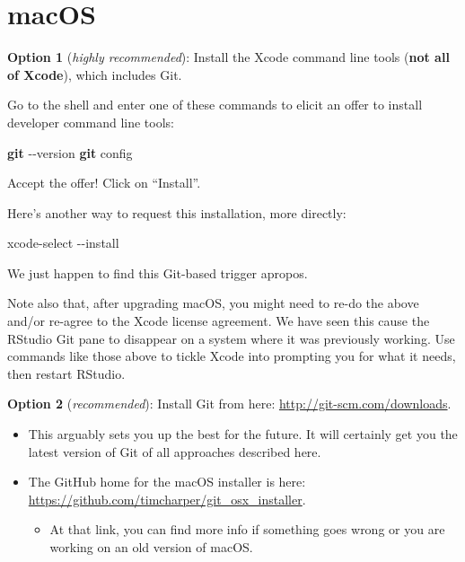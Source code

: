 \documentclass[
]{book}
\newenvironment{Shaded}{\begin{snugshade}}{\end{snugshade}}
\newcommand{\AttributeTok}[1]{\textcolor[rgb]{0.13,0.29,0.53}{#1}}
\newcommand{\ExtensionTok}[1]{#1}
\newcommand{\FunctionTok}[1]{\textcolor[rgb]{0.13,0.29,0.53}{\textbf{#1}}}
\newcommand{\NormalTok}[1]{#1}
\providecommand{\tightlist}{%
  \setlength{\itemsep}{0pt}\setlength{\parskip}{0pt}}
\begin{document}
\section{macOS}\label{macos}

\textbf{Option 1} (\emph{highly recommended}): Install the Xcode command line tools (\textbf{not all of Xcode}), which includes Git.

Go to the shell and enter one of these commands to elicit an offer to install developer command line tools:

\begin{Shaded}
\begin{Highlighting}[]
\FunctionTok{git} \AttributeTok{{-}{-}version}
\FunctionTok{git}\NormalTok{ config}
\end{Highlighting}
\end{Shaded}

Accept the offer! Click on ``Install''.

Here's another way to request this installation, more directly:

\begin{Shaded}
\begin{Highlighting}[]
\ExtensionTok{xcode{-}select} \AttributeTok{{-}{-}install}
\end{Highlighting}
\end{Shaded}

We just happen to find this Git-based trigger apropos.

Note also that, after upgrading macOS, you might need to re-do the above and/or re-agree to the Xcode license agreement. We have seen this cause the RStudio Git pane to disappear on a system where it was previously working. Use commands like those above to tickle Xcode into prompting you for what it needs, then restart RStudio.

\textbf{Option 2} (\emph{recommended}): Install Git from here: \url{http://git-scm.com/downloads}.

\begin{itemize}
\tightlist
\item
  This arguably sets you up the best for the future. It will certainly get you the latest version of Git of all approaches described here.
\item
  The GitHub home for the macOS installer is here: \url{https://github.com/timcharper/git_osx_installer}.

  \begin{itemize}
  \tightlist
  \item
    At that link, you can find more info if something goes wrong or you are working on an old version of macOS.
  \end{itemize}
\end{itemize}
\end{document}
